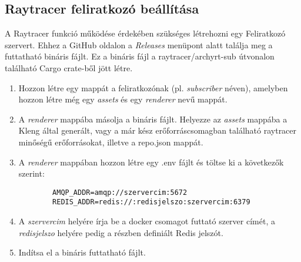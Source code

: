 \subsection{Raytracer feliratkozó beállítása}\label{subscriber}


A Raytracer funkció működése érdekében szükséges létrehozni egy Feliratkozó szervert.
Ehhez a GitHub oldalon a \emph{Releases} menüpont alatt találja meg a futtatható bináris fájlt.
Ez a bináris fájl a raytracer/archyrt-sub útvonalon található Cargo crate-ből jött létre.


\begin{enumerate}
    \item Hozzon létre egy mappát a feliratkozónak (pl. \emph{subscriber} néven), amelyben hozzon létre még egy \emph{assets} és egy \emph{renderer} nevű mappát.

    \item A \emph{renderer} mappába másolja a bináris fájlt. Helyezze az \emph{assets} mappába a Kleng által generált, vagy a már kész erőforráscsomagban található raytracer minőségű erőforrásokat, illetve a repo.json mappát.

    \item A \emph{renderer} mappában hozzon létre egy .env fájlt és töltse ki a következők szerint:
          \begin{lstlisting}
        AMQP_ADDR=amqp://szervercim:5672
        REDIS_ADDR=redis://:redisjelszo:szervercim:6379\end{lstlisting}

    \item A \emph{szervercim} helyére írja be a docker csomagot futtató szerver címét, a \emph{redisjelszo} helyére pedig a \textbf{} részben definiált Redis jelszót.

    \item Indítsa el a bináris futtatható fájlt.
\end{enumerate}